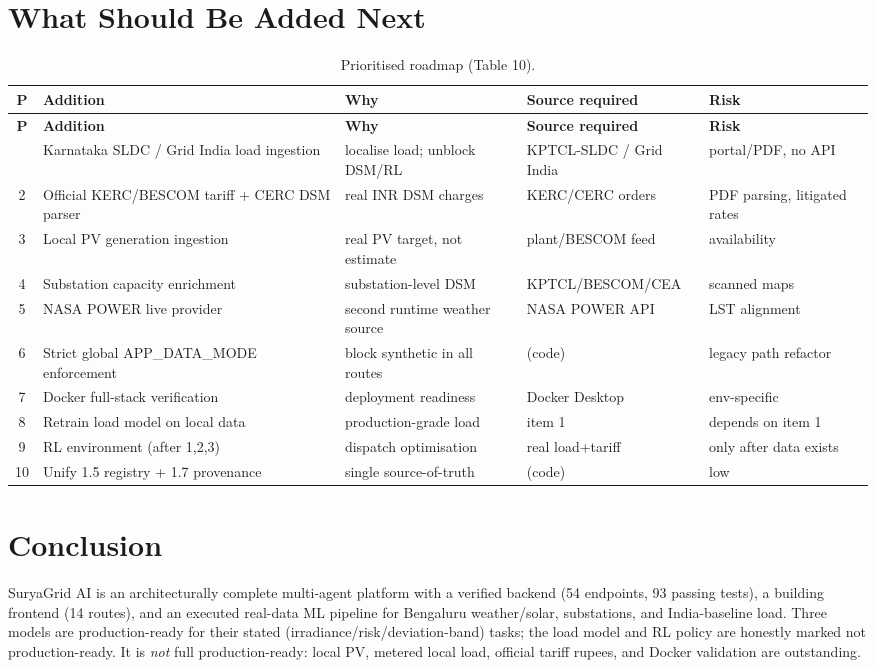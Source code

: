 \documentclass[11pt,a4paper]{article}
\begin{document}
\section{What Should Be Added Next}
\begin{footnotesize}
\begin{longtable}{@{}c p{3.2cm}p{3.0cm}p{2.6cm}p{2.6cm}@{}}
\caption{Prioritised roadmap (Table 10).}\label{tab:roadmap}\\
\toprule
\textbf{P} & \textbf{Addition} & \textbf{Why} & \textbf{Source required} & \textbf{Risk}\\
\midrule
\endfirsthead
\toprule
\textbf{P} & \textbf{Addition} & \textbf{Why} & \textbf{Source required} & \textbf{Risk}\\
\midrule
\endhead
\bottomrule
\endfoot
1 & Karnataka SLDC / Grid India load ingestion & localise load; unblock DSM/RL & KPTCL-SLDC / Grid India & portal/PDF, no API\\
2 & Official KERC/BESCOM tariff + CERC DSM parser & real INR DSM charges & KERC/CERC orders & PDF parsing, litigated rates\\
3 & Local PV generation ingestion & real PV target, not estimate & plant/BESCOM feed & availability\\
4 & Substation capacity enrichment & substation-level DSM & KPTCL/BESCOM/CEA & scanned maps\\
5 & NASA POWER live provider & second runtime weather source & NASA POWER API & LST alignment\\
6 & Strict global APP\_DATA\_MODE enforcement & block synthetic in all routes & (code) & legacy path refactor\\
7 & Docker full-stack verification & deployment readiness & Docker Desktop & env-specific\\
8 & Retrain load model on local data & production-grade load & item 1 & depends on item 1\\
9 & RL environment (after 1,2,3) & dispatch optimisation & real load+tariff & only after data exists\\
10 & Unify 1.5 registry + 1.7 provenance & single source-of-truth & (code) & low\\
\end{longtable}
\end{footnotesize}

\section{Conclusion}
SuryaGrid AI is an architecturally complete multi-agent platform with a verified backend
(54 endpoints, 93 passing tests), a building frontend (14 routes), and an executed
real-data ML pipeline for Bengaluru weather/solar, substations, and India-baseline load.
Three models are production-ready for their stated (irradiance/risk/deviation-band) tasks;
the load model and RL policy are honestly marked not production-ready. It is \emph{not}
full production-ready: local PV, metered local load, official tariff rupees, and Docker
validation are outstanding.
\end{document}
